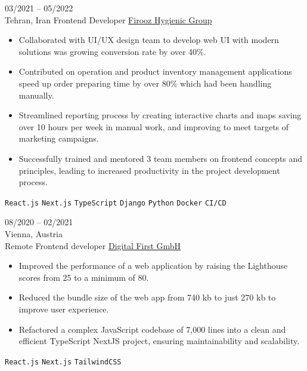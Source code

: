 \documentclass[8pt]{developercv} %
\begin{document}
\begin{entrylist}
        \entry
        {03/2021 -- 05/2022 \\ Tehran, Iran}
        {Frontend Developer}
        {\href{https://firoozshop.com/}{Firooz Hygienic Group}}
        {\vspace{-10pt}
            \begin{itemize}[noitemsep,topsep=0pt,parsep=0pt,partopsep=0pt, leftmargin=-1pt]
                \item Collaborated with UI/UX design team to develop web UI with modern solutions was growing conversion rate by over 40\%.
                \item Contributed on operation and product inventory management applications speed up order preparing time by over 80\% which had been handling manually.
                \item Streamlined reporting process by creating interactive charts and maps saving over 10 hours per week in manual work, and improving to meet targets of marketing campaigns.
                \item Successfully trained and mentored 3 team members on frontend concepts and principles, leading to increased productivity in the project development process.
            \end{itemize}
            \texttt{React.js} \slashsep \texttt{Next.js} \slashsep \texttt{TypeScript} \slashsep \texttt{Django} \slashsep \texttt{Python} \slashsep \texttt{Docker} \slashsep \texttt{CI/CD}
        }

        \entry
        {08/2020 -- 02/2021 \\ Vienna, Austria \\ Remote}
        {Frontend developer}
        {\href{https://dfirst.eu/}{Digital First GmbH}}
        {\vspace{-10pt}
            \begin{itemize}[noitemsep,topsep=0pt,parsep=0pt,partopsep=0pt, leftmargin=-1pt]
                \item Improved the performance of a web application by raising the Lighthouse scores from 25 to a minimum of 80.
                \item Reduced the bundle size of the web app from 740 kb to just 270 kb to improve user experience.
                \item Refactored a complex JavaScript codebase of 7,000 lines into a clean and efficient TypeScript NextJS project, ensuring maintainability and scalability.
            \end{itemize}
            \texttt{React.js} \slashsep \texttt{Next.js} \slashsep \texttt{TailwindCSS}
        }


\end{entrylist}
\end{document}
